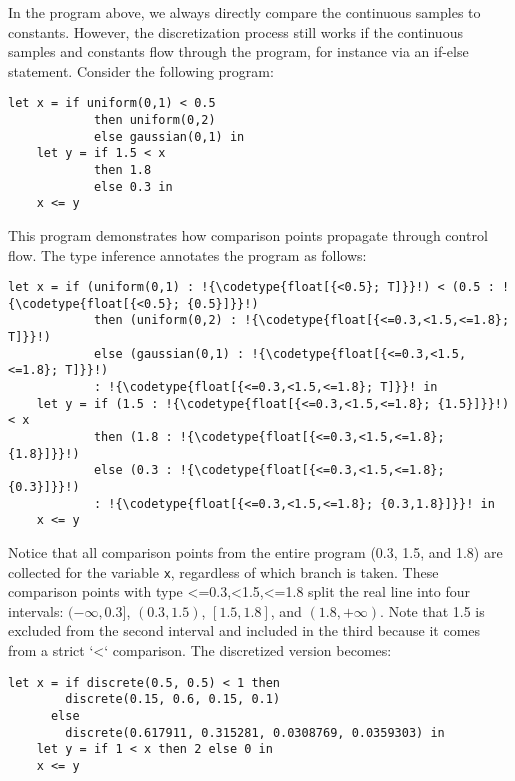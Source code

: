 \documentclass[acmsmall,screen,dvipsnames,x11names,nonacm,anonymous,review]{acmart}
\newcommand{\codetype}[1]{\textcolor{typecolor}{\ttfamily\small#1}}
\begin{document}
In the program above, we always directly compare the continuous samples to constants.
However, the discretization process still works if the continuous samples and constants flow through the program, for instance via an if-else statement.
Consider the following program:

\begin{lstlisting}[aboveskip=1em,belowskip=1em,escapechar=!]
    let x = if uniform(0,1) < 0.5 
            then uniform(0,2) 
            else gaussian(0,1) in
    let y = if 1.5 < x
            then 1.8
            else 0.3 in
    x <= y
\end{lstlisting}

\noindent This program demonstrates how comparison points propagate through control flow. The type inference annotates the program as follows:

\begin{lstlisting}[aboveskip=1em,belowskip=1em,escapechar=!]
    let x = if (uniform(0,1) : !{\codetype{float[{<0.5}; T]}}!) < (0.5 : !{\codetype{float[{<0.5}; {0.5}]}}!)
            then (uniform(0,2) : !{\codetype{float[{<=0.3,<1.5,<=1.8}; T]}}!)
            else (gaussian(0,1) : !{\codetype{float[{<=0.3,<1.5,<=1.8}; T]}}!)
            : !{\codetype{float[{<=0.3,<1.5,<=1.8}; T]}}! in
    let y = if (1.5 : !{\codetype{float[{<=0.3,<1.5,<=1.8}; {1.5}]}}!) < x
            then (1.8 : !{\codetype{float[{<=0.3,<1.5,<=1.8}; {1.8}]}}!)
            else (0.3 : !{\codetype{float[{<=0.3,<1.5,<=1.8}; {0.3}]}}!)
            : !{\codetype{float[{<=0.3,<1.5,<=1.8}; {0.3,1.8}]}}! in
    x <= y
\end{lstlisting}

\noindent Notice that all comparison points from the entire program (0.3, 1.5, and 1.8) are collected for the variable \texttt{x}, regardless of which branch is taken. These comparison points with type \codetype{<=0.3,<1.5,<=1.8} split the real line into four intervals: $(-\infty, 0.3]$, $(0.3, 1.5)$, $[1.5, 1.8]$, and $(1.8, +\infty)$. Note that 1.5 is excluded from the second interval and included in the third because it comes from a strict `<` comparison. The discretized version becomes:

\begin{lstlisting}[aboveskip=1em,belowskip=1em]
    let x = if discrete(0.5, 0.5) < 1 then
        discrete(0.15, 0.6, 0.15, 0.1)
      else
        discrete(0.617911, 0.315281, 0.0308769, 0.0359303) in
    let y = if 1 < x then 2 else 0 in
    x <= y
\end{lstlisting}
\end{document}
